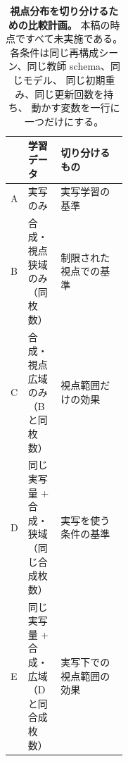 \begin{table}[t]
  \centering
  \caption{\textbf{視点分布を切り分けるための比較計画。}
  本稿の時点ですべて未実施である。
  各条件は同じ再構成シーン、同じ教師 schema、同じモデル、
  同じ初期重み、同じ更新回数を持ち、
  動かす変数を一行に一つだけにする。
  }
  \label{tab:ablation_plan}
  \small
  \begin{tabularx}{\linewidth}{@{}p{0.05\linewidth}p{0.28\linewidth}X@{}}
    \toprule
    & 学習データ & 切り分けるもの \\
    \midrule
    A & 実写のみ & 実写学習の基準 \\
    B & 合成・視点狭域のみ（同枚数） & 制限された視点での基準 \\
    C & 合成・視点広域のみ（B と同枚数） & 視点範囲だけの効果 \\
    D & 同じ実写量 + 合成・狭域（同じ合成枚数） & 実写を使う条件の基準 \\
    E & 同じ実写量 + 合成・広域（D と同合成枚数） & 実写下での視点範囲の効果 \\
    \bottomrule
  \end{tabularx}
\end{table}
